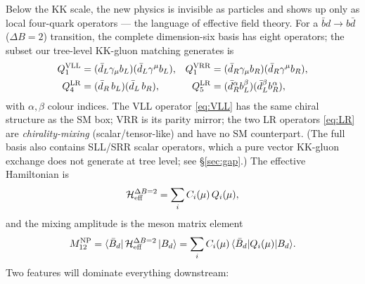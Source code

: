 \documentclass[11pt]{article}
\newcommand{\Mtwelve}{M_{12}}
\newcommand{\Bd}{B_d}
\newcommand{\Bdbar}{\bar B_d}
\theoremstyle{definition}
\begin{document}
Below the KK scale, the new physics is invisible as particles and shows up only
as local four-quark operators --- the language of effective field theory. For a
$\bar b d \to b \bar d$ ($\Delta B=2$) transition, the complete dimension-six
basis has eight operators; the subset our tree-level KK-gluon matching generates
is
\begin{align}
Q_1^{\rm VLL} &= (\bar d_L\gamma_\mu b_L)(\bar d_L\gamma^\mu b_L), &
Q_1^{\rm VRR} &= (\bar d_R\gamma_\mu b_R)(\bar d_R\gamma^\mu b_R),
\label{eq:VLL}\\
Q_4^{\rm LR} &= (\bar d_R\, b_L)(\bar d_L\, b_R), &
Q_5^{\rm LR} &= (\bar d_R^\alpha b_L^\beta)(\bar d_L^\beta b_R^\alpha),
\label{eq:LR}
\end{align}
with $\alpha,\beta$ colour indices. The VLL operator \eqref{eq:VLL} has the same
chiral structure as the SM box; VRR is its parity mirror; the two LR operators
\eqref{eq:LR} are \emph{chirality-mixing} (scalar/tensor-like) and have no SM
counterpart. (The full basis also contains SLL/SRR scalar operators, which a pure
vector KK-gluon exchange does not generate at tree level; see
\S\ref{sec:gap}.) The effective Hamiltonian is
\begin{equation}
\mathcal{H}^{\Delta B=2}_{\rm eff}
   = \sum_i C_i(\mu)\, Q_i(\mu),
\label{eq:Heff}
\end{equation}
and the mixing amplitude is the meson matrix element
\begin{equation}
\Mtwelve^{\rm NP}
   = \langle \Bdbar |\, \mathcal{H}^{\Delta B=2}_{\rm eff}\, | \Bd\rangle
   = \sum_i C_i(\mu)\, \langle \Bdbar | Q_i(\mu) | \Bd\rangle .
\label{eq:M12sum}
\end{equation}
Two features will dominate everything downstream:
\end{document}
